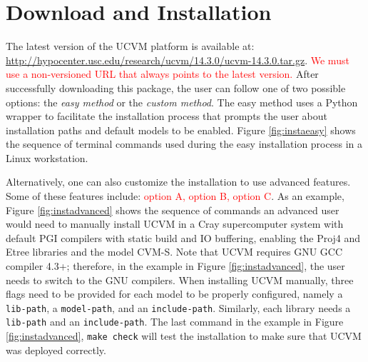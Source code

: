 
\section{Download and Installation}
\label{sec:installation}

The latest version of the UCVM platform is available at:
%
\url{http://hypocenter.usc.edu/research/ucvm/14.3.0/ucvm-14.3.0.tar.gz}. 
\textcolor{red}{We must use a non-versioned URL that always points to the latest version.}
%
After successfully downloading this package, the user can follow one of two possible options: the \textit{easy method} or the \textit{custom method}. The easy method uses a Python wrapper to facilitate the installation process that prompts the user about installation paths and default models to be enabled. Figure \ref{fig:instaeasy} shows the sequence of terminal commands used during the easy installation process in a Linux workstation.



Alternatively, one can also customize the installation to use advanced features. Some of these features include: \textcolor{red}{option A, option B, option C}. As an example, Figure \ref{fig:instadvanced} shows the sequence of commands an advanced user would need to manually install UCVM in a Cray supercomputer system with default PGI compilers with static build and IO buffering, enabling the Proj4 and Etree libraries and the model CVM-S. Note that UCVM requires GNU GCC compiler 4.3+; therefore, in the example in Figure \ref{fig:instadvanced}, the user needs to switch to the GNU compilers. When installing UCVM manually, three flags need to be provided for each model to be properly configured, namely a \texttt{lib-path}, a \texttt{model-path}, and an \texttt{include-path}. Similarly, each library needs a \texttt{lib-path} and an \texttt{include-path}. The last command in the example in Figure \ref{fig:instadvanced}, \texttt{make check} will test the installation to make sure that UCVM was deployed correctly.



